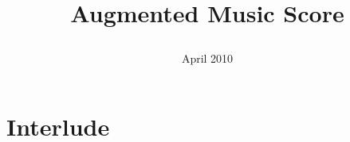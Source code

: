 \else

\newcommand{\french}[1] 	{}
\newcommand{\eng}[1] 		{#1}

\def\version{April 2010}
\def\exemple{Example}
\def\implementation{Implementation}
\def\synchronisation{Synchronization}
\def\saidempty{is said empty when }
\def\ou{or}
\def\where{where}
\def\graphic{graphic}
\def\reltime{relative time}
\def\texte{text}
\def\score{score}
\def\vectoriel{vectorial}
\def\demo{Demo}
\def\et{and}
\def\ffond{fundamental frequency}
\def\ksigcolor{constant color signal}
\def\ksigthick{constant thickness signal}
\def\ksigrms{RMS signal}
\newcommand{\rmsval}[1] 	{#1 RMS values}

\fi


\title{{\huge 
\french{Partition musicale augmentée}
\eng{Augmented Music Score}
}}


\date[Février 2010]{{\scriptsize \version}}




\frame{\titlepage}

\section{Interlude}
